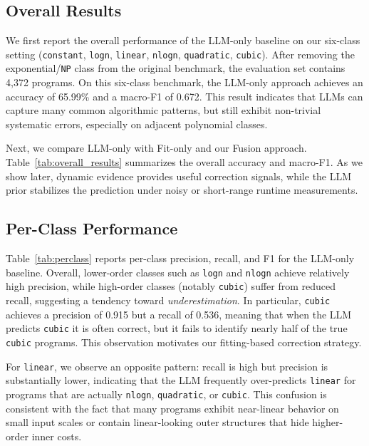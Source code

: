 \documentclass[conference]{IEEEtran}
\begin{document}
\subsection{Overall Results} 
 \label{subsec:overall_results} 
 
 We first report the overall performance of the LLM-only baseline on our six-class setting 
 (\texttt{constant}, \texttt{logn}, \texttt{linear}, \texttt{nlogn}, \texttt{quadratic}, \texttt{cubic}). 
 After removing the exponential/\texttt{NP} class from the original benchmark, the evaluation set 
 contains 4,372 programs. On this six-class benchmark, the LLM-only approach achieves an accuracy of 
 65.99\% and a macro-F1 of 0.672. 
 This result indicates that LLMs can capture many common algorithmic patterns, but still exhibit 
 non-trivial systematic errors, especially on adjacent polynomial classes. 
 
 Next, we compare LLM-only with Fit-only and our Fusion approach. Table~\ref{tab:overall_results} 
 summarizes the overall accuracy and macro-F1. As we show later, dynamic evidence provides useful 
 correction signals, while the LLM prior stabilizes the prediction under noisy or short-range runtime 
 measurements. 
 
 \subsection{Per-Class Performance} 
 \label{subsec:perclass_results} 
 
 Table~\ref{tab:perclass} reports per-class precision, recall, and F1 for the LLM-only baseline. 
 Overall, lower-order classes such as \texttt{logn} and \texttt{nlogn} achieve relatively high precision, 
 while high-order classes (notably \texttt{cubic}) suffer from reduced recall, suggesting a tendency 
 toward \emph{underestimation}. 
 In particular, \texttt{cubic} achieves a precision of 0.915 but a recall of 0.536, meaning that when the 
 LLM predicts \texttt{cubic} it is often correct, but it fails to identify nearly half of the true 
 \texttt{cubic} programs. This observation motivates our fitting-based correction strategy. 
 
 For \texttt{linear}, we observe an opposite pattern: recall is high but precision is substantially lower, 
 indicating that the LLM frequently over-predicts \texttt{linear} for programs that are actually 
 \texttt{nlogn}, \texttt{quadratic}, or \texttt{cubic}. This confusion is consistent with the fact that many 
 programs exhibit near-linear behavior on small input scales or contain linear-looking outer structures 
 that hide higher-order inner costs. 
 
\end{document}
